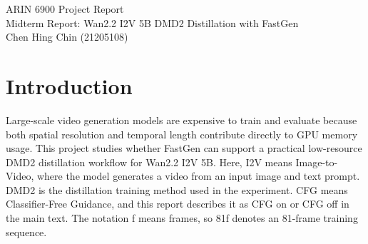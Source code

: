 \documentclass[12pt,a4paper]{article}
\begin{document}
\begin{center}
{\Large ARIN 6900 Project Report}\\[0.7em]
{\LARGE Midterm Report: Wan2.2 I2V 5B DMD2 Distillation with FastGen}\\[1.5em]
{\large Chen Hing Chin (21205108)}
\end{center}

\vspace{1.5em}

\begin{abstract}
This report presents my midterm work on DMD2 distillation for Wan2.2 Image-to-Video (I2V) generation under the FastGen framework. The goal is to evaluate whether the native Wan2.2 I2V 5B DMD2 training setup can be adapted to a limited 2x32GB GPU environment while still completing training, saving checkpoints, and running student-only I2V inference. Before this work, I used Wan2.1 / FFGO-compatible experiments to become familiar with FastGen training, checkpoint management, and inference asset archiving. The main work in this report focuses on Wan2.2 I2V 5B, memory feasibility, DMD2 training stability, and checkpoint usability. The original 81f + CFG on setup reached an out-of-memory condition during the DMD2 negative teacher forward path. A shorter 49f attempt reduced temporal length but became incompatible with the discriminator temporal kernel. The main training configuration was therefore adjusted to 65f + CFG on, which completed 5000 iterations, saved checkpoints from \texttt{0001000} to \texttt{0005000}, resumed from \texttt{0005000}, and saved \texttt{0013000}. Additional LR x10 from-scratch training progressed to 22000 iterations, with stable checkpoints up to \texttt{0021000} and a failed save attempt at \texttt{0022000}. This report focuses on training feasibility, checkpoint saving, and inference flow archiving; subjective and quantitative video quality evaluation is left for follow-up work.
\end{abstract}

\section{Introduction}

Large-scale video generation models are expensive to train and evaluate because both spatial resolution and temporal length contribute directly to GPU memory usage. This project studies whether FastGen can support a practical low-resource DMD2 distillation workflow for Wan2.2 I2V 5B. Here, I2V means Image-to-Video, where the model generates a video from an input image and text prompt. DMD2 is the distillation training method used in the experiment. CFG means Classifier-Free Guidance, and this report describes it as CFG on or CFG off in the main text. The notation f means frames, so 81f denotes an 81-frame training sequence.
\end{document}
